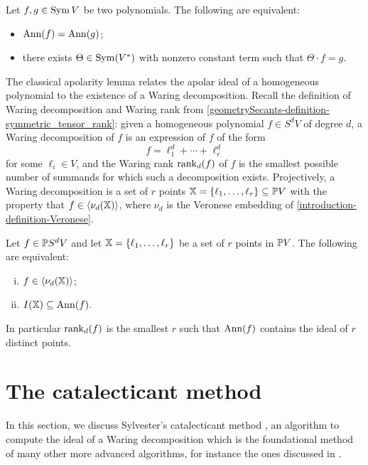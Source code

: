 \begin{proposition}
\label{apolarity-proposition-sameApolar}
 Let $f,g \in \operatorname{Sym} V$ be two polynomials. The following are equivalent:
 \begin{itemize}
  \item $\operatorname{Ann}(f) = \operatorname{Ann}(g)$;
  \item there exists $\Theta \in \operatorname{Sym}(V^*)$ with nonzero constant term such that $\Theta \cdot f = g$. 
 \end{itemize}
\end{proposition}

The classical apolarity lemma relates the apolar ideal of a homogeneous polynomial to the existence of a Waring decomposition. Recall the definition of Waring decomposition and Waring rank from \ref{geometrySecants-definition-symmetric_tensor_rank}: given a homogeneous polynomial $f \in S^d V$ of degree $d$, a Waring decomposition of $f$ is an expression of $f$ of the form 
\[
f = \ell_1^d + \cdots + \ell_r^d
\]
for some $\ell_i \in V$, and the Waring rank $\mathrm{rank}_d(f)$ of $f$ is the smallest possible number of summands for which such a decomposition exists. Projectively, a Waring decomposition is a set of $r$ points $\mathbb{X} = \{ \ell_1 , \ldots , \ell_r \} \subseteq \mathbb{P} V$ with the property that $f \in \langle \nu_d(\mathbb{X}) \rangle$, where $\nu_d$ is the Veronese embedding of \ref{introduction-definition-Veronese}. 

\begin{lemma}
 \label{apolarity-lemma-apolarityLemma}
 Let $f \in \mathbb{P} S^d V$ and let $\mathbb{X} = \{ \ell_1 , \ldots , \ell_r\}$ be a set of $r$ points in $\mathbb{P} V$. The following are equivalent:
 \begin{enumerate}[(i)]
  \item $f \in \langle \nu_d(\mathbb{X}) \rangle$;
  \item $I(\mathbb{X}) \subseteq \operatorname{Ann}(f)$.
 \end{enumerate}
 In particular $\mathrm{rank}_d(f)$ is the smallest $r$ such that $\operatorname{Ann}(f)$ contains the ideal of $r$ distinct points.
\end{lemma}



\section{The catalecticant method}
\label{apolarity-section-catalecticant}
In this section, we discuss Sylvester's catalecticant method \cite{Syl52,IK99}, an algorithm to compute the ideal of a Waring decomposition which is the foundational method of many other more advanced algorithms, for instance the ones discussed in \cite{BCMT10,BBCM13,BT20,LMR23}.

